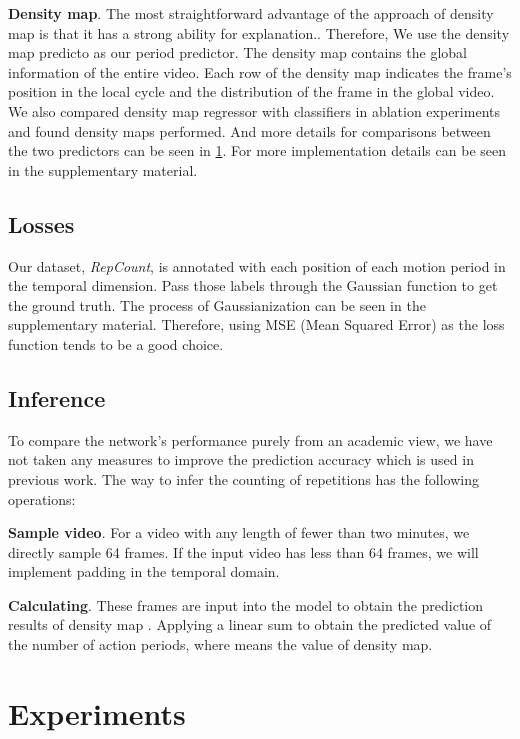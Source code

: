 \documentclass[10pt,twocolumn,letterpaper]{article}
\begin{document}
\noindent \textbf{Density map}.
The most straightforward advantage of the approach of density map is that it has a strong ability for explanation.. Therefore, We use the density map predicto as our period predictor. The density map contains the global information of the entire video. Each row of the density map indicates the frame's position in the local cycle and the distribution of the frame in the global video. We also compared density map regressor with classifiers in ablation experiments and found density maps performed. And more details for comparisons between the two predictors can be seen in \cref{sec:experiment}. For more implementation details can be seen in the supplementary material.



 \subsection{Losses}  
 Our dataset, \emph{RepCount}, is annotated with each position of each motion period in the temporal dimension. Pass those labels through the Gaussian function  to get the ground truth. The process of Gaussianization can be seen in the supplementary material. Therefore, using MSE (Mean Squared Error) as the loss function tends to be a good choice.


\subsection{Inference}
To compare the network's performance purely from an academic view, we have not taken any measures to improve the prediction accuracy which is used in previous work\cite{RepNet}. The way to infer the counting of  repetitions has the following operations:

\noindent \textbf{Sample video}.
For a video with any length of fewer than two minutes, we directly sample 64 frames. If the input video has less than 64 frames, we will implement padding in the temporal domain.
       
\noindent \textbf{Calculating}.
These frames are input into the model to obtain the prediction results of density map . Applying a linear sum to obtain the predicted value  of the number of action periods, where  means the value of density map.

\section{Experiments}
\label{sec:experiment}
\end{document}
